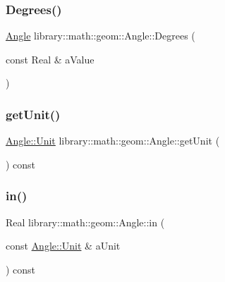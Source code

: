 \subsubsection{\texorpdfstring{Degrees()}{Degrees()}}
{\footnotesize\ttfamily \hyperlink{classlibrary_1_1math_1_1geom_1_1_angle}{Angle} library\+::math\+::geom\+::\+Angle\+::\+Degrees (\begin{DoxyParamCaption}\item[{const Real \&}]{a\+Value }\end{DoxyParamCaption})\hspace{0.3cm}{\ttfamily [static]}}

\mbox{\label{classlibrary_1_1math_1_1geom_1_1_angle_a68d7f79c9c8111f4f3f4b44d0a9eea99}} 
\subsubsection{\texorpdfstring{get\+Unit()}{getUnit()}}
{\footnotesize\ttfamily \hyperlink{classlibrary_1_1math_1_1geom_1_1_angle_ab593c4dafbb9a5c29fdbe114eaae8eae}{Angle\+::\+Unit} library\+::math\+::geom\+::\+Angle\+::get\+Unit (\begin{DoxyParamCaption}{ }\end{DoxyParamCaption}) const}

\mbox{\label{classlibrary_1_1math_1_1geom_1_1_angle_ade7cdca64f1f5c6df4f9d1398eb36edc}} 
\subsubsection{\texorpdfstring{in()}{in()}}
{\footnotesize\ttfamily Real library\+::math\+::geom\+::\+Angle\+::in (\begin{DoxyParamCaption}\item[{const \hyperlink{classlibrary_1_1math_1_1geom_1_1_angle_ab593c4dafbb9a5c29fdbe114eaae8eae}{Angle\+::\+Unit} \&}]{a\+Unit }\end{DoxyParamCaption}) const}

\mbox{\label{classlibrary_1_1math_1_1geom_1_1_angle_a91406717714cf457ce83aced432ac58f}} 
